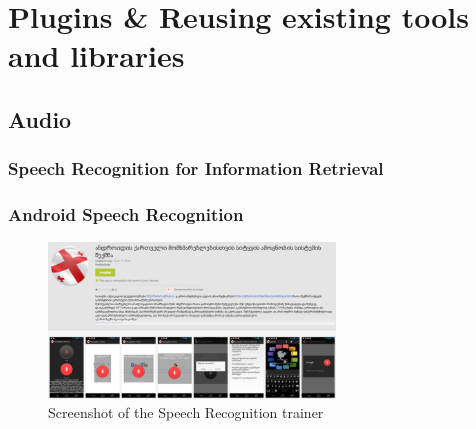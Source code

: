 \documentclass{beamer}
\begin{document}
\section[Plugins]{Plugins \& Reusing existing tools and libraries}

\subsection{Audio}
%
%
%
%


\subsubsection[ASR]{Speech Recognition for Information Retrieval}

\begin{frame}
\frametitle{Android Speech Recognition}
\begin{figure}
\begin{center}
\includegraphics[width=3in]{../figures/kartuli_speech_recognition}
\caption{Screenshot of the Speech Recognition trainer}
\label{speech_recognition_screenshot}
\end{center}
\end{figure}

\end{frame}
\end{document}
